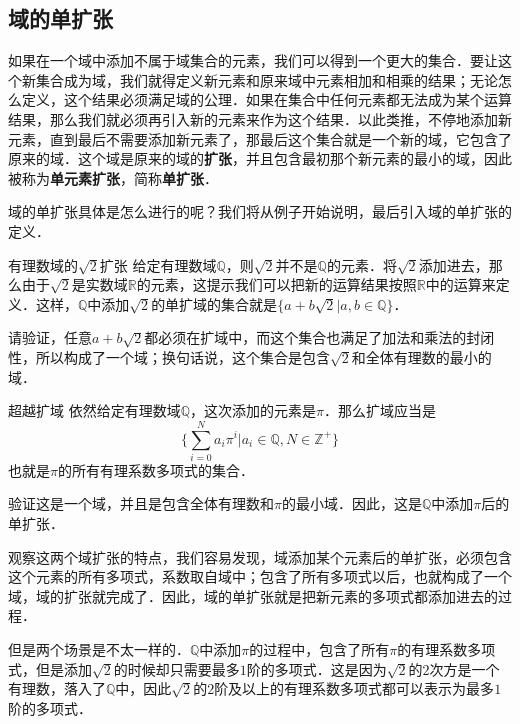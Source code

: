 

\subsection{域的单扩张}
如果在一个域中添加不属于域集合的元素，我们可以得到一个更大的集合．要让这个新集合成为域，我们就得定义新元素和原来域中元素相加和相乘的结果；无论怎么定义，这个结果必须满足域的公理．如果在集合中任何元素都无法成为某个运算结果，那么我们就必须再引入新的元素来作为这个结果．以此类推，不停地添加新元素，直到最后不需要添加新元素了，那最后这个集合就是一个新的域，它包含了原来的域．这个域是原来的域的\textbf{扩张}，并且包含最初那个新元素的最小的域，因此被称为\textbf{单元素扩张}，简称\textbf{单扩张}．

域的单扩张具体是怎么进行的呢？我们将从例子开始说明，最后引入域的单扩张的定义．

\begin{exercise}{有理数域的$\sqrt{2}$扩张}\label{FldExp_exe1}
给定有理数域$\mathbb{Q}$，则$\sqrt{2}$并不是$\mathbb{Q}$的元素．将$\sqrt{2}$添加进去，那么由于$\sqrt{2}$是实数域$\mathbb{R}$的元素，这提示我们可以把新的运算结果按照$\mathbb{R}$中的运算来定义．这样，$\mathbb{Q}$中添加$\sqrt{2}$的单扩域的集合就是$\{a+b\sqrt{2}|a, b\in\mathbb{Q}\}$．

请验证，任意$a+b\sqrt{2}$都必须在扩域中，而这个集合也满足了加法和乘法的封闭性，所以构成了一个域；换句话说，这个集合是包含$\sqrt{2}$和全体有理数的最小的域．
\end{exercise}

\begin{exercise}{超越扩域}\label{FldExp_exe2}
依然给定有理数域$\mathbb{Q}$，这次添加的元素是$\pi$．那么扩域应当是
\begin{equation}
\{\sum_{i=0}^N a_i\pi^i|a_i\in\mathbb{Q}, N\in\mathbb{Z}^+\}\end{equation}
也就是$\pi$的所有有理系数多项式的集合．

验证这是一个域，并且是包含全体有理数和$\pi$的最小域．因此，这是$\mathbb{Q}$中添加$\pi$后的单扩张．
\end{exercise}

观察这两个域扩张的特点，我们容易发现，域添加某个元素后的单扩张，必须包含这个元素的所有多项式，系数取自域中；包含了所有多项式以后，也就构成了一个域，域的扩张就完成了．因此，域的单扩张就是把新元素的多项式都添加进去的过程．

但是两个场景是不太一样的．$\mathbb{Q}$中添加$\pi$的过程中，包含了所有$\pi$的有理系数多项式，但是添加$\sqrt{2}$的时候却只需要最多$1$阶的多项式．这是因为$\sqrt{2}$的$2$次方是一个有理数，落入了$\mathbb{Q}$中，因此$\sqrt{2}$的$2$阶及以上的有理系数多项式都可以表示为最多$1$阶的多项式．

